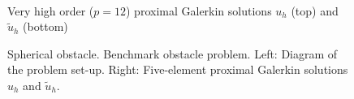 \documentclass[aspectratio=169,xcolor=dvipsnames,11pt]{beamer}
\begin{document}
\begin{frame}
\begin{figure}
\begin{minipage}[c]{0.475\textwidth}
\begin{minipage}[c]{0.075\textwidth}
		\end{minipage}%
		\\
		Very high order ($p=12$) proximal Galerkin solutions $u_h$ (top) and $\tilde{u}_h$ (bottom)
	\end{minipage}
	\caption{
	Spherical obstacle.
	Benchmark obstacle problem.
	Left: Diagram of the problem set-up.
	Right: Five-element proximal Galerkin solutions $u_h$ and $\tilde{u}_h$.
	\label{fig:ObstacleSphere}}
\end{figure}
\end{frame}
\end{document}
